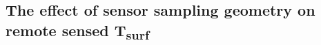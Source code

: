 \begin{bibunit}

\subsection{The effect of sensor sampling geometry on remote sensed T\textsubscript{surf}}


\end{bibunit}
